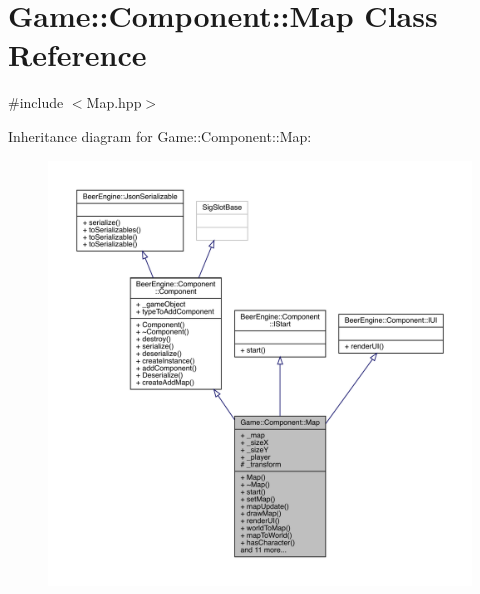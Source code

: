 \hypertarget{class_game_1_1_component_1_1_map}{}\section{Game\+:\+:Component\+:\+:Map Class Reference}
\label{class_game_1_1_component_1_1_map}


{\ttfamily \#include $<$Map.\+hpp$>$}



Inheritance diagram for Game\+:\+:Component\+:\+:Map\+:\nopagebreak
\begin{figure}[H]
\begin{center}
\leavevmode
\includegraphics[width=350pt]{class_game_1_1_component_1_1_map__inherit__graph}
\end{center}
\end{figure}


